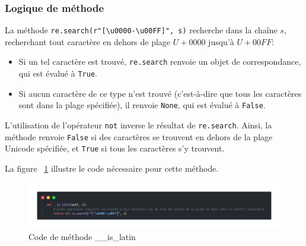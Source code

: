\newpage
\subsubsection{Logique de méthode}
\noindent
La méthode \texttt{re.search(r"[\textbackslash u0000-\textbackslash u00FF]", s)} recherche dans la chaîne \( s \), recherchant tout caractère en dehors de plage \( U+0000 \) jusqu'à \( U+00FF \):
\begin{itemize}
    \item Si un tel caractère est trouvé, \texttt{re.search} renvoie un objet de correspondance, qui est évalué à \texttt{True}.
    \item Si aucun caractère de ce type n'est trouvé (c'est-à-dire que tous les caractères sont dans la plage spécifiée), il renvoie \texttt{None}, qui est évalué à \texttt{False}.
\end{itemize}
L'utilisation de l'opérateur \texttt{not} inverse le résultat de \texttt{re.search}. Ainsi, la méthode renvoie \texttt{False} si des caractères se trouvent en dehors de la plage Unicode spécifiée, et \texttt{True} si tous les caractères s'y trouvent.

\noindent
La figure ~\ref{fig:islatin} illustre le code nécessaire pour cette méthode.

\begin{figure}[H]
	\centering
	\includegraphics[width=1\textwidth]{logos/islatin.png}
	\caption{Code de méthode \_\_is\_latin}
	\label{fig:islatin}
\end{figure}